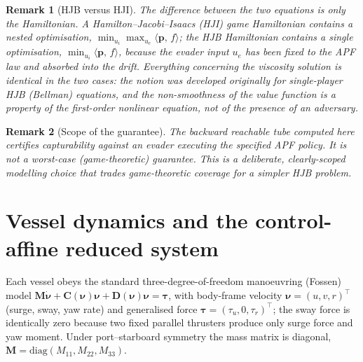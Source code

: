 \documentclass[11pt]{article}
\newtheorem{remark}{Remark}
\newcommand{\pbf}{\bm{p}}
\newcommand{\inner}[2]{\langle #1,\, #2\rangle}
\begin{document}
\begin{remark}[HJB versus HJI]
The difference between the two equations is only the Hamiltonian. A Hamilton--Jacobi--Isaacs (HJI)
game Hamiltonian contains a nested optimisation, $\min_{u_i}\max_{u_e}\inner{\pbf}{f}$; the HJB
Hamiltonian contains a single optimisation, $\min_{u_i}\inner{\pbf}{f}$, because the evader input
$u_e$ has been fixed to the APF law and absorbed into the drift. Everything concerning the
\emph{viscosity solution} is identical in the two cases: the notion was developed originally for
single-player HJB (Bellman) equations, and the non-smoothness of the value function is a property
of the first-order nonlinear equation, not of the presence of an adversary.
\end{remark}

\begin{remark}[Scope of the guarantee]
The backward reachable tube computed here certifies capturability against an evader executing the
specified APF policy. It is not a worst-case (game-theoretic) guarantee. This is a deliberate,
clearly-scoped modelling choice that trades game-theoretic coverage for a simpler HJB problem.
\end{remark}

\section{Vessel dynamics and the control-affine reduced system}

Each vessel obeys the standard three-degree-of-freedom manoeuvring (Fossen) model
$\bm{M}\dot{\bm{\nu}}+\bm{C}(\bm{\nu})\bm{\nu}+\bm{D}(\bm{\nu})\bm{\nu}=\bm{\tau}$, with body-frame
velocity $\bm{\nu}=(u,v,r)^\top$ (surge, sway, yaw rate) and generalised force
$\bm{\tau}=(\tau_u,0,\tau_r)^\top$; the sway force is identically zero because two fixed parallel
thrusters produce only surge force and yaw moment. Under port--starboard symmetry the mass matrix
is diagonal, $\bm{M}=\mathrm{diag}(M_{11},M_{22},M_{33})$.
\end{document}
